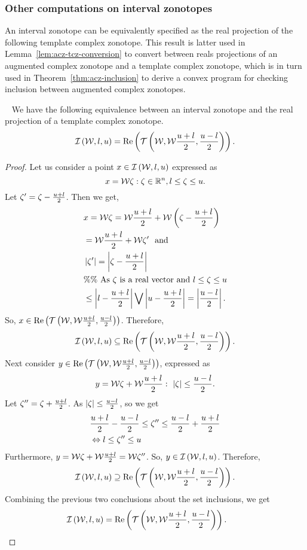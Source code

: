 \subsubsection*{Other computations on interval zonotopes}
%
An interval zonotope can be equivalently specified as the real
projection of the following template complex zonotope.  This result is
latter used in Lemma~\ref{lem:acz-tcz-conversion} to convert between
reals projections of an augmented complex zonotope and a template
complex zonotope, which is in turn used in
Theorem~\ref{thm:acz-inclusion} to derive a convex program for
checking inclusion between augmented complex zonotopes.
%
\begin{lemma}~\label{lem:iz-tcz-conversion}
We have the following equivalence between an interval zonotope and the
real projection of a template complex zonotope.
%
\[
\mathit{\operatorname{\mathcal{I}}}\left(\mathcal{W},l,u\right)=\operatorname{Re}\left(\mathit{\operatorname{\mathcal{T}}}\left(\mathcal{W},\mathcal{W}\frac{u+l}{2},\frac{u-l}{2}\right)\right).
\]
%
\end{lemma}
%
\begin{proof}
Let us consider a point $x\in\mathit{\operatorname{\mathcal{I}}}\left(\mathcal{W},l,u\right)$ expressed as
%
\[
x=\mathcal{W}\zeta:\zeta\in\mathbb{R}^n,l\leq\zeta\leq u.
\]
%
  Let $\zeta^\prime=
\zeta-\frac{u+l}{2}$.
Then we get,
%
\begin{align*}
& x=\mathcal{W}\zeta=\mathcal{W}\frac{u+l}{2}+\mathcal{W}\left(\zeta-\frac{u+l}{2}\right)\\
& = \mathcal{W}\frac{u+l}{2}+\mathcal{W}\zeta^\prime~~\text{and}\\
& \left|\zeta^\prime\right|=\left|\zeta-\frac{u+l}{2}\right|\\
& \%\%~\text{As $\zeta$ is a real vector and $l\leq\zeta\leq u$}\\
& \leq \left|l-\frac{u+l}{2}\right|\bigvee \left|u-\frac{u+l}{2}\right|
= \left|\frac{u-l}{2}\right|.
\end{align*}
%
So,
$x\in\operatorname{Re}\left(\mathit{\operatorname{\mathcal{T}}}\left(\mathcal{W},\mathcal{W}\frac{u+l}{2},\frac{u-l}{2}\right)\right)$.  Therefore,
%
\[
\mathit{\operatorname{\mathcal{I}}}\left(\mathcal{W},l,u\right)\subseteq\operatorname{Re}\left(\mathit{\operatorname{\mathcal{T}}}\left(\mathcal{W},\mathcal{W}\frac{u+l}{2},\frac{u-l}{2}\right)\right).
\]
%
Next consider $y\in\operatorname{Re}\left(\mathit{\operatorname{\mathcal{T}}}\left(\mathcal{W},\mathcal{W}\frac{u+l}{2},\frac{u-l}{2}\right)\right)$,
expressed as
\[
y=\mathcal{W}\zeta+\mathcal{W}\frac{u+l}{2}:~\left|\zeta\right|\leq\frac{u-l}{2}.
\]
%
Let $\zeta^{\prime\prime}=\zeta+\frac{u+l}{2}$.
As
$\left|\zeta\right|\leq\frac{u-l}{2}$, so we get
%
\begin{align*}
&
\frac{u+l}{2}-\frac{u-l}{2}\leq\zeta^{\prime\prime}\leq\frac{u-l}{2}+\frac{u+l}{2}\\
& \Leftrightarrow l\leq\zeta^{\prime\prime}\leq u
\end{align*}
%
Furthermore, $y=\mathcal{W}\zeta+\mathcal{W}\frac{u+l}{2}=\mathcal{W}\zeta^{\prime\prime}$.
So, $y\in\mathit{\operatorname{\mathcal{I}}}\left(\mathcal{W},l,u\right)$.  Therefore,
%
\[
\mathit{\operatorname{\mathcal{I}}}\left(\mathcal{W},l,u\right)\supseteq\operatorname{Re}\left(\mathit{\operatorname{\mathcal{T}}}\left(\mathcal{W},\mathcal{W}\frac{u+l}{2},\frac{u-l}{2}\right)\right).
\]
%
Combining the previous two conclusions about the set inclusions, we get
%
\[
\mathit{\operatorname{\mathcal{I}}}\left(\mathcal{W},l,u\right)=\operatorname{Re}\left(\mathit{\operatorname{\mathcal{T}}}\left(\mathcal{W},\mathcal{W}\frac{u+l}{2},\frac{u-l}{2}\right)\right).~~~~~~\qedhere
\]
%
\end{proof}
